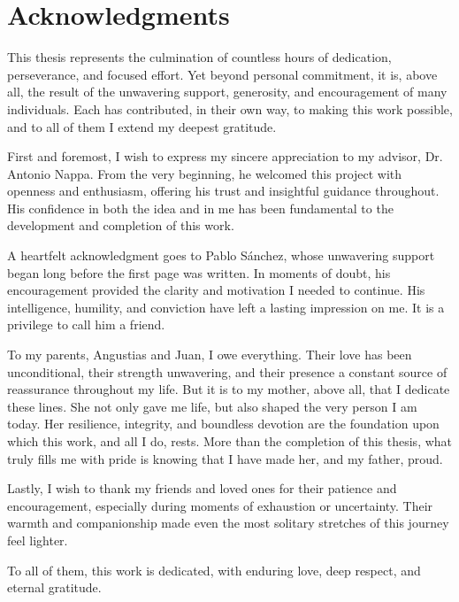 \documentclass[12pt]{report}
\begin{document}
\chapter*{Acknowledgments}

This thesis represents the culmination of countless hours of dedication, perseverance, and focused effort. Yet beyond personal commitment, it is, above all, the result of the unwavering support, generosity, and encouragement of many individuals. Each has contributed, in their own way, to making this work possible, and to all of them I extend my deepest gratitude.

First and foremost, I wish to express my sincere appreciation to my advisor, Dr. Antonio Nappa. From the very beginning, he welcomed this project with openness and enthusiasm, offering his trust and insightful guidance throughout. His confidence in both the idea and in me has been fundamental to the development and completion of this work.

A heartfelt acknowledgment goes to Pablo Sánchez, whose unwavering support began long before the first page was written. In moments of doubt, his encouragement provided the clarity and motivation I needed to continue. His intelligence, humility, and conviction have left a lasting impression on me. It is a privilege to call him a friend.

To my parents, Angustias and Juan, I owe everything. Their love has been unconditional, their strength unwavering, and their presence a constant source of reassurance throughout my life. But it is to my mother, above all, that I dedicate these lines. She not only gave me life, but also shaped the very person I am today. Her resilience, integrity, and boundless devotion are the foundation upon which this work, and all I do, rests. More than the completion of this thesis, what truly fills me with pride is knowing that I have made her, and my father, proud.

Lastly, I wish to thank my friends and loved ones for their patience and encouragement, especially during moments of exhaustion or uncertainty. Their warmth and companionship made even the most solitary stretches of this journey feel lighter.

To all of them, this work is dedicated, with enduring love, deep respect, and eternal gratitude.
\newpage

\tableofcontents
\thispagestyle{fancy}

\newpage
\end{document}
